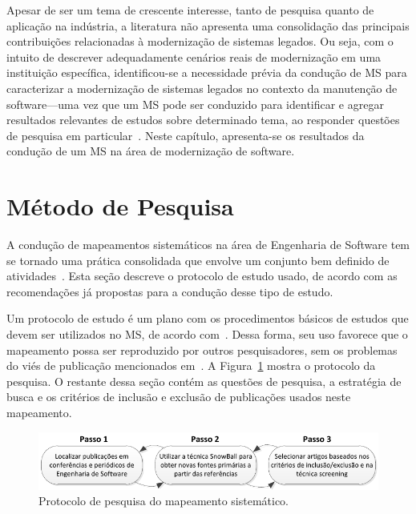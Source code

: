\label{mapeamento}

Apesar de ser um tema de crescente interesse, tanto 
de pesquisa quanto de aplicação na indústria, a literatura 
não apresenta uma consolidação das principais contribuições 
relacionadas à modernização de sistemas legados. Ou seja, com o 
intuito de descrever adequadamente cenários reais de modernização 
em uma instituição específica, identificou-se  a necessidade 
prévia da condução de \acrfull{MS} para 
caracterizar a modernização de sistemas legados no 
contexto da manutenção de software---uma vez que 
um \acrshort{MS} pode ser conduzido 
para identificar e agregar resultados relevantes 
de estudos sobre determinado tema, ao responder 
questões de pesquisa em particular~\cite{kitchenham:2004,Petersen:2008}. 
Neste capítulo, apresenta-se os resultados da condu\c c\~{a}o de 
um \acrshort{MS} na \'{a}rea de moderniza\c c\~{a}o de software.

\section{Método de Pesquisa}

A condução de mapeamentos sistemáticos na área de 
Engenharia de Software tem se tornado uma prática 
consolidada que envolve um conjunto bem definido 
de atividades~\cite{Petersen:2008}. Esta seção descreve 
o protocolo de estudo usado, 
de acordo com as recomendações já propostas para a 
condução desse tipo de estudo. 

Um protocolo de estudo é um plano com os procedimentos básicos de 
estudos que devem ser utilizados no MS, de acordo com~\cite{Petersen:2008}. 
Dessa forma, seu  uso favorece que o mapeamento 
possa ser reproduzido por outros pesquisadores, 
sem os problemas do viés de publicação 
mencionados em~\cite{kitchenham:2004}. A Figura~\ref{fig:protocolo_pesquisa_ms} 
mostra o protocolo da pesquisa. O restante dessa seção contém as questões de pesquisa, 
a estratégia de busca e os critérios de inclusão e 
exclusão de publicações usados neste mapeamento.


\begin{figure}
\centering
\includegraphics[scale=1.2]{img/mapeamento/protocolo_pesquisa_ms.pdf}
\caption{Protocolo de pesquisa do mapeamento sistemático.}
\label{fig:protocolo_pesquisa_ms}
\end{figure}


